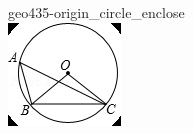 \documentclass[12pt]{article}
\begin{document}
\begin{center}
\begin{minipage}{0.32\textwidth}
\end{minipage}
\hfill\begin{minipage}{0.32\textwidth}\centering
geo435-origin\_circle\_enclose\\
\includegraphics[width=0.95\linewidth]{out_rommath_origin/items/geo435-origin/assets/figure_circle.png}
\end{minipage}
\par
\end{center}
\bigskip
\end{document}
